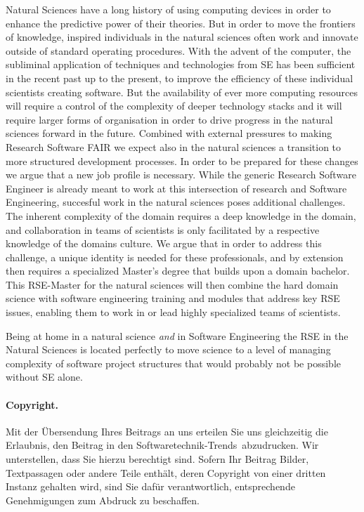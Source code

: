 \documentclass[
        twocolumn,german,biblatex
    ]{article}
\newcommand{\stt}{Soft\-ware\-tech\-nik-Trends}
\begin{document}
    Natural Sciences have a long history of using computing devices in
    order to enhance the predictive power of their theories. But in
    order to move the frontiers of knowledge, inspired individuals in
    the natural sciences often work and innovate outside of standard
    operating procedures. With the advent of the computer, the
    subliminal application of techniques and technologies from SE has
    been sufficient in the recent past up to the present, to improve the
    efficiency of these individual scientists creating software. But the
    availability of ever more computing resources will require a control
    of the complexity of deeper technology stacks and it will require
    larger forms of organisation in order to drive progress in the
    natural sciences forward in the future. Combined with external
    pressures to making Research Software FAIR we expect also in the
    natural sciences a transition to more structured development
    processes. In order to be prepared for these changes we argue that a
    new job profile is necessary. While the generic Research Software
    Engineer is already meant to work at this intersection of research
    and Software Engineering, succesful work in the natural sciences
    poses additional challenges. The inherent complexity of the domain
    requires a deep knowledge in the domain, and collaboration in teams
    of scientists is only facilitated by a respective knowledge of the
    domains culture. We argue that in order to address this challenge, a
    unique identity is needed for these professionals, and by extension
    then requires a specialized Master's degree that builds upon a
    domain bachelor. This RSE-Master for the natural sciences will then
    combine the hard domain science with software engineering training
    and modules that address key RSE issues, enabling them to work in or
    lead highly specialized teams of scientists.

    Being at home in a natural science \emph{and} in Software
    Engineering the RSE in the Natural Sciences is located perfectly to
    move science to a level of managing complexity of software project
    structures that would probably not be possible without SE alone.

\paragraph{Copyright.}

Mit der Übersendung Ihres Beitrags an uns erteilen Sie uns gleichzeitig die Erlaubnis,
den Beitrag in den \stt\ abzudrucken. Wir unterstellen, dass Sie hierzu berechtigt sind.
Sofern Ihr Beitrag Bilder, Textpassagen oder andere Teile enthält, deren Copyright
von einer dritten Instanz gehalten wird, sind Sie dafür verantwortlich,
entsprechende Genehmigungen zum Abdruck zu beschaffen.


\printbibliography
\end{document}
